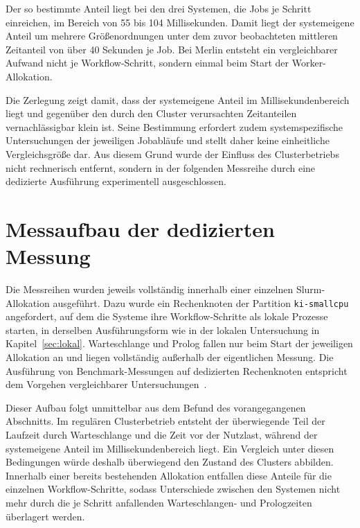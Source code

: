 Der so bestimmte Anteil liegt bei den drei Systemen, die Jobs je
Schritt einreichen, im Bereich von 55 bis 104 Millisekunden. Damit liegt der systemeigene Anteil um mehrere Größenordnungen unter dem zuvor beobachteten mittleren Zeitanteil von über 40 Sekunden je Job. Bei
Merlin entsteht ein vergleichbarer Aufwand nicht je
Workflow-Schritt, sondern einmal beim Start der Worker-Allokation.


Die Zerlegung zeigt damit, dass der systemeigene Anteil im
Millisekundenbereich liegt und gegenüber den durch den Cluster
verursachten Zeitanteilen vernachlässigbar klein ist. Seine
Bestimmung erfordert zudem systemspezifische Untersuchungen der
jeweiligen Jobabläufe und stellt daher keine einheitliche
Vergleichsgröße dar. Aus diesem Grund wurde der Einfluss des
Clusterbetriebs nicht rechnerisch entfernt, sondern in der
folgenden Messreihe durch eine dedizierte Ausführung experimentell
ausgeschlossen.



\section{Messaufbau der dedizierten Messung}
\label{sec:mogon:dediziert}

Die Messreihen wurden jeweils vollständig innerhalb einer einzelnen
Slurm-Allokation ausgeführt. Dazu wurde ein Rechenknoten der
Partition \texttt{ki-smallcpu} angefordert, auf dem die Systeme
ihre Workflow-Schritte als lokale Prozesse starten, in derselben
Ausführungsform wie in der lokalen Untersuchung in
Kapitel~\ref{sec:lokal}. Warteschlange und Prolog fallen nur beim
Start der jeweiligen Allokation an und liegen vollständig außerhalb
der eigentlichen Messung. Die Ausführung von Benchmark-Messungen
auf dedizierten Rechenknoten entspricht dem Vorgehen vergleichbarer
Untersuchungen~\cite{wfbench2022}.

Dieser Aufbau folgt unmittelbar aus dem Befund des vorangegangenen
Abschnitts. Im regulären Clusterbetrieb entsteht der überwiegende
Teil der Laufzeit durch Warteschlange und die Zeit vor der
Nutzlast, während der systemeigene Anteil im Millisekundenbereich
liegt. Ein Vergleich unter diesen Bedingungen würde deshalb
überwiegend den Zustand des Clusters abbilden. Innerhalb einer
bereits bestehenden Allokation entfallen diese Anteile für die
einzelnen Workflow-Schritte, sodass Unterschiede zwischen den
Systemen nicht mehr durch die je Schritt anfallenden
Warteschlangen- und Prologzeiten überlagert werden.

